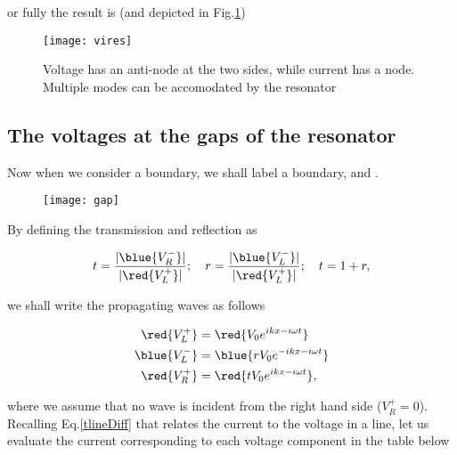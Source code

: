  \noindent or fully the result is (and depicted in Fig.\ref{tlineVI})


 \begin{figure}
   \centering%
   \texttt{[image: vires]}
   \caption{Voltage has an  anti-node at the two  sides, while current
     has  a   node.   Multiple  modes   can  be  accomodated   by  the
     resonator\label{tlineVI}}
 \end{figure}

 \subsection{The voltages at the gaps of the resonator}
 Now when  we consider  a boundary,  we shall  label  a boundary, and .

  \begin{figure}[h]
    \centering%
    \texttt{[image: gap]}
  \end{figure}

  \noindent By defining the transmission and reflection as

 \begin{equation}
   t=\frac{|\blue{V_{R}^{-}}|}{|\red{V_{L}^{+}}|}; \quad r=\frac{|\blue{V_{L}^{-}}|}{|\red{V_{L}^{+}}|}; \quad t=1+r,
 \end{equation}

 \noindent we shall write the propagating waves as follows

 \begin{align}
   \red{V_L^{+}} & = \red{V_0e^{ikx-i\omega t}} \\
   \blue{V_L^{-}} & = \blue{rV_0e^{-ikx-i\omega t}}\\
   \red{V_R^{+}} & = \red{tV_0e^{ikx-i\omega t}},
 \end{align}

 \noindent where  we assume that  no wave  is incident from  the right
 hand  side  ($  V_R^{+}=0 $).   Recalling  Eq.\eqref{tlineDiff}  that
 relates the  current to the  voltage in a  line, let us  evaluate the
 current corresponding to each voltage component in the table below


